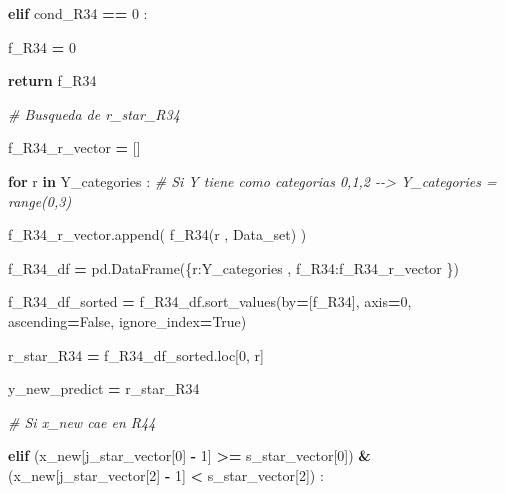 \documentclass[
  11pt,
  a4paper,
]{article}
\newenvironment{Shaded}{\begin{snugshade}}{\end{snugshade}}
\newcommand{\CommentTok}[1]{\textcolor[rgb]{0.56,0.35,0.01}{\textit{#1}}}
\newcommand{\ControlFlowTok}[1]{\textcolor[rgb]{0.13,0.29,0.53}{\textbf{#1}}}
\newcommand{\DecValTok}[1]{\textcolor[rgb]{0.00,0.00,0.81}{#1}}
\newcommand{\KeywordTok}[1]{\textcolor[rgb]{0.13,0.29,0.53}{\textbf{#1}}}
\newcommand{\NormalTok}[1]{#1}
\newcommand{\OperatorTok}[1]{\textcolor[rgb]{0.81,0.36,0.00}{\textbf{#1}}}
\newcommand{\StringTok}[1]{\textcolor[rgb]{0.31,0.60,0.02}{#1}}
\newcommand{\VariableTok}[1]{\textcolor[rgb]{0.00,0.00,0.00}{#1}}
\begin{document}
\begin{Shaded}
\begin{Highlighting}[]
                        \ControlFlowTok{elif}\NormalTok{ cond\_R34 }\OperatorTok{==} \DecValTok{0}\NormalTok{ :}

\NormalTok{                            f\_R34 }\OperatorTok{=} \DecValTok{0}

                        \ControlFlowTok{return}\NormalTok{ f\_R34}

                
            \CommentTok{\# Busqueda de r\_star\_R34}

\NormalTok{                f\_R34\_r\_vector }\OperatorTok{=}\NormalTok{ []}

                \ControlFlowTok{for}\NormalTok{ r }\KeywordTok{in}\NormalTok{ Y\_categories :  }\CommentTok{\# Si Y tiene como categorias 0,1,2 {-}{-}\textgreater{} Y\_categories = range(0,3)}

\NormalTok{                    f\_R34\_r\_vector.append( f\_R34(r , Data\_set) )}

\NormalTok{                f\_R34\_df }\OperatorTok{=}\NormalTok{ pd.DataFrame(\{}\StringTok{\textquotesingle{}r\textquotesingle{}}\NormalTok{:Y\_categories  , }\StringTok{\textquotesingle{}f\_R34\textquotesingle{}}\NormalTok{:f\_R34\_r\_vector \})}
        
\NormalTok{                f\_R34\_df\_sorted }\OperatorTok{=}\NormalTok{ f\_R34\_df.sort\_values(by}\OperatorTok{=}\NormalTok{[}\StringTok{\textquotesingle{}f\_R34\textquotesingle{}}\NormalTok{], axis}\OperatorTok{=}\DecValTok{0}\NormalTok{, ascending}\OperatorTok{=}\VariableTok{False}\NormalTok{, ignore\_index}\OperatorTok{=}\VariableTok{True}\NormalTok{)}

\NormalTok{                r\_star\_R34 }\OperatorTok{=}\NormalTok{ f\_R34\_df\_sorted.loc[}\DecValTok{0}\NormalTok{, }\StringTok{\textquotesingle{}r\textquotesingle{}}\NormalTok{]}


\NormalTok{                y\_new\_predict }\OperatorTok{=}\NormalTok{ r\_star\_R34}


            
            \CommentTok{\# Si x\_new cae en R44}

            \ControlFlowTok{elif}\NormalTok{ (x\_new[j\_star\_vector[}\DecValTok{0}\NormalTok{] }\OperatorTok{{-}} \DecValTok{1}\NormalTok{] }\OperatorTok{\textgreater{}=}\NormalTok{ s\_star\_vector[}\DecValTok{0}\NormalTok{]) }\OperatorTok{\&}\NormalTok{ (x\_new[j\_star\_vector[}\DecValTok{2}\NormalTok{] }\OperatorTok{{-}} \DecValTok{1}\NormalTok{] }\OperatorTok{\textless{}}\NormalTok{ s\_star\_vector[}\DecValTok{2}\NormalTok{])  :}


\end{Highlighting}
\end{Shaded}
\end{document}
